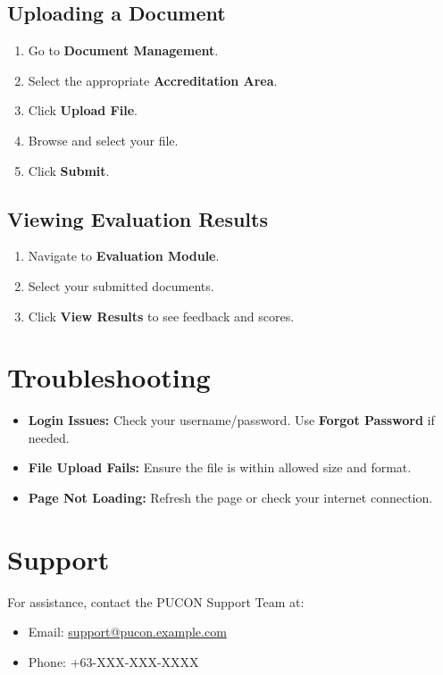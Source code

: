 \documentclass[11pt,a4paper]{article}
\begin{document}
\subsection{Uploading a Document}
\begin{enumerate}
    \item Go to \textbf{Document Management}.
    \item Select the appropriate \textbf{Accreditation Area}.
    \item Click \textbf{Upload File}.
    \item Browse and select your file.
    \item Click \textbf{Submit}.
\end{enumerate}

\subsection{Viewing Evaluation Results}
\begin{enumerate}
    \item Navigate to \textbf{Evaluation Module}.
    \item Select your submitted documents.
    \item Click \textbf{View Results} to see feedback and scores.
\end{enumerate}

\section{Troubleshooting}
\begin{itemize}
    \item \textbf{Login Issues:} Check your username/password. Use \textbf{Forgot Password} if needed.
    \item \textbf{File Upload Fails:} Ensure the file is within allowed size and format.
    \item \textbf{Page Not Loading:} Refresh the page or check your internet connection.
\end{itemize}

\section{Support}
For assistance, contact the PUCON Support Team at:
\begin{itemize}
    \item Email: \href{mailto:support@pucon.example.com}{support@pucon.example.com}
    \item Phone: +63-XXX-XXX-XXXX
\end{itemize}
\end{document}
